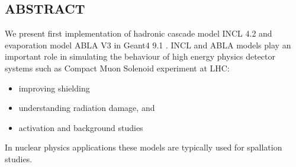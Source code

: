 \documentclass[20pt]{article}
\newenvironment{textbox}
{\begin{lrbox}{\dummybox}\begin{minipage}{0.9\columnwidth}}
{\end{minipage}\end{lrbox}\raisebox{-\depth}{\psshadowbox[framesep=1em,framearc=.1,shadow=true]{\usebox{\dummybox}}}\vspace{0.005\textheight}}
\begin{document}
\begin{center}
\begin{multicols}{3}
\begin{textbox}

\section*{{\Huge {\sf ABSTRACT}}}

{\color{udsect}
We present first implementation \cite{fp} of hadronic cascade model INCL 4.2
\cite{incl} and evaporation model ABLA V3 \cite{abla} in Geant4 9.1 \cite{g4}.
\vskip0.5cm
INCL and ABLA models play an important role in simulating the behaviour of high energy physics
detector systems such as Compact Muon Solenoid experiment at LHC:
\begin{itemize}
\item improving shielding
\item understanding radiation damage, and
\item activation and background studies
\end{itemize}
In nuclear physics
applications these models are typically used for spallation studies.

%
%

}

\end{textbox}
\begin{textbox}


\end{textbox}
\end{multicols}
\end{center}
\end{document}
